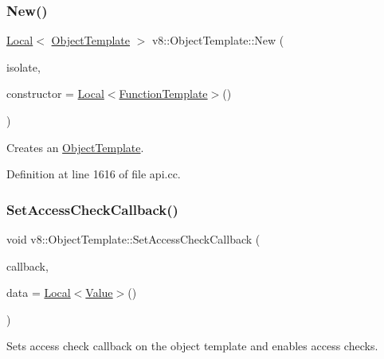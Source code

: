 \subsubsection{\texorpdfstring{New()}{New()}}
{\footnotesize\ttfamily \mbox{\hyperlink{classv8_1_1Local}{Local}}$<$ \mbox{\hyperlink{classv8_1_1ObjectTemplate}{Object\+Template}} $>$ v8\+::\+Object\+Template\+::\+New (\begin{DoxyParamCaption}\item[{Isolate $\ast$}]{isolate,  }\item[{\mbox{\hyperlink{classv8_1_1Local}{v8\+::\+Local}}$<$ \mbox{\hyperlink{classv8_1_1FunctionTemplate}{Function\+Template}} $>$}]{constructor = {\ttfamily \mbox{\hyperlink{classv8_1_1Local}{Local}}$<$\mbox{\hyperlink{classv8_1_1FunctionTemplate}{Function\+Template}}$>$()} }\end{DoxyParamCaption})\hspace{0.3cm}{\ttfamily [static]}}

Creates an \mbox{\hyperlink{classv8_1_1ObjectTemplate}{Object\+Template}}. 

Definition at line 1616 of file api.\+cc.

\mbox{\label{classv8_1_1ObjectTemplate_a5b0337016cd89fc72f3a9d75399c2487}} 
\subsubsection{\texorpdfstring{Set\+Access\+Check\+Callback()}{SetAccessCheckCallback()}}
{\footnotesize\ttfamily void v8\+::\+Object\+Template\+::\+Set\+Access\+Check\+Callback (\begin{DoxyParamCaption}\item[{\mbox{\hyperlink{namespacev8_a1024fb358d107c1494163217830688e6}{Access\+Check\+Callback}}}]{callback,  }\item[{\mbox{\hyperlink{classv8_1_1Local}{Local}}$<$ \mbox{\hyperlink{classv8_1_1Value}{Value}} $>$}]{data = {\ttfamily \mbox{\hyperlink{classv8_1_1Local}{Local}}$<$\mbox{\hyperlink{classv8_1_1Value}{Value}}$>$()} }\end{DoxyParamCaption})}

Sets access check callback on the object template and enables access checks.

